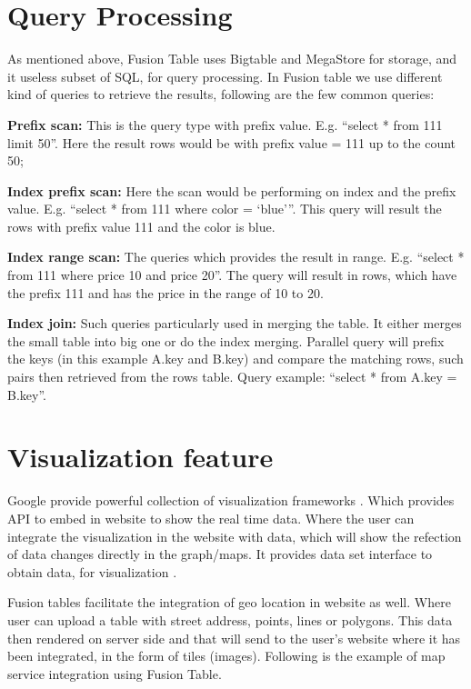 \documentclass[9pt,twocolumn,twoside]{../../styles/osajnl}
\begin{document}
\section{Query Processing}

As mentioned above, Fusion Table uses Bigtable and MegaStore for storage, and it useless subset of SQL, for query processing. In Fusion table we use different kind of queries to retrieve the results, following are the few common queries:

\textbf{Prefix scan:} This is the query type with prefix value. E.g. “select * from 111 limit 50”.  Here the result rows would be with prefix value = 111 up to the count 50;

\textbf{Index prefix scan:} Here the scan would be performing on index and the prefix value. E.g. “select * from 111 where color = ‘blue’”. This query will result the rows with prefix value 111 and the color is blue. 

\textbf{Index range scan:} The queries which provides the result in range. E.g. “select * from 111 where price 10 and price 20”. The query will result in rows, which have the prefix 111 and has the price in the range of 10 to 20.

\textbf{Index join:} Such queries particularly used in merging the table. It either merges the small table into big one or do the index merging. Parallel query will prefix the keys (in this example A.key and B.key) and compare the matching rows, such pairs then retrieved from the rows table. Query example: “select * from A.key = B.key”.  




\section{Visualization feature}

Google provide powerful collection of visualization frameworks \cite{www-7}. Which provides API to embed in website to show the real time data. 
Where the user can integrate the visualization in the website with data, which will show the refection of data changes directly in the graph/maps. It provides data set interface to obtain data, for visualization \cite{www-7}. 


Fusion tables facilitate the integration of geo location in website as well. Where user can upload a table with street address, points, lines or polygons. This data then rendered on server side and that will send to the user’s website where it has been integrated, in the form of tiles (images). Following is the example of map service integration using Fusion Table.
\end{document}
